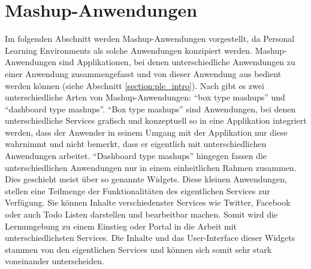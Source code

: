 \section{Mashup-Anwendungen}\label{section:mashup_anwendungen}
Im folgenden Abschnitt werden Mashup-Anwendungen vorgestellt, da Personal Learning Environments als solche Anwendungen konzipiert werden. Mashup-Anwendungen sind Applikationen, bei denen unterschiedliche Anwendungen zu einer Anwendung zusammengefasst und von dieser Anwendung aus bedient werden können (siehe Abschnitt \ref{section:ple_intro}). Nach \cite{Soylu2011} gibt es zwei unterschiedliche Arten von Mashup-Anwendungen: "`box type mashups"' und "`dashboard type mashups"'. "`Box type mashups"' sind Anwendungen, bei denen unterschiedliche Services grafisch und konzeptuell so in eine Applikation integriert werden, dass der Anwender in seinem Umgang mit der Applikation nur diese wahrnimmt und nicht bemerkt, dass er eigentlich mit unterschiedlichen Anwendungen arbeitet. "`Dashboard type mashups"' hingegen fassen die unterschiedlichen Anwendungen nur in einem einheitlichen Rahmen zusammen. Dies geschieht meist über so genannte Widgets. Diese kleinen Anwendungen, stellen eine Teilmenge der Funktionalitäten des eigentlichen Services zur Verfügung. Sie können Inhalte verschiedenster Services wie Twitter, Facebook oder auch Todo Listen darstellen und bearbeitbar machen. Somit wird die Lernumgebung zu einem Einstieg oder Portal in die Arbeit mit unterschiedlichsten Services.  Die Inhalte und das User-Interface dieser Widgets stammen von den eigentlichen Services und können sich somit sehr stark voneinander unterscheiden. 


